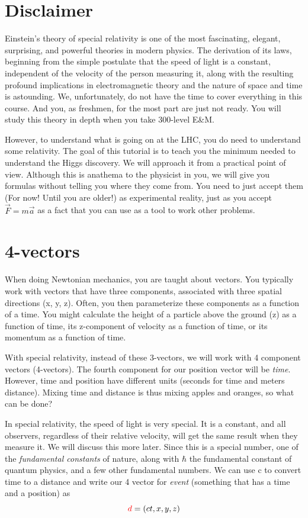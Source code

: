  
\section{Disclaimer}

Einstein's theory of special relativity is one of the most fascinating, elegant, surprising, and powerful theories in modern physics.  The derivation of its laws, beginning from the simple postulate that the speed of light is a constant, independent of the velocity of the person measuring it, along with the resulting profound implications in electromagnetic theory and the nature of space and time is astounding. We, unfortunately, do not have the time to cover everything in this course.  And you, as freshmen, for the most part are just not ready.  You will study this theory in depth when you take 300-level E\&M.

However, to understand what is going on at the LHC, you do need to understand some relativity.  The goal of this tutorial is to teach you the minimum needed to understand the Higgs discovery.  We will approach it from a practical point of view. Although this is anathema to the physicist in you, we will give you formulas without telling you where they come from.  You need to just accept them (For now! Until you are older!) as experimental reality, just as you accept $\vec{F}=m\vec{a}$  as a fact that you can use as a tool to work other problems.

\section{4-vectors}

When doing Newtonian mechanics, you are taught about vectors.  You typically work with vectors that have three components, associated with three spatial directions (x, y, z).  Often, you then parameterize these components as a function of a time.  You might calculate the height of a particle above the ground (z) as a function of time, its z-component of velocity as a function of time, or its momentum as a function of time.

With special relativity, instead of these 3-vectors, we will work with 4 component vectors (4-vectors).  The fourth component for our position vector will be {\it time}.  However, time and position have different units (seconds for time and meters distance).  Mixing time and distance is thus mixing apples and oranges, so what can be done?

In special relativity, the speed of light is very special.  It is a constant, and all observers, regardless of their relative velocity, will get the same result when they measure it. We will discuss this more later.  Since this is a special number, one of the {\it fundamental constants} of nature, along with  $\hbar$ the fundamental constant of quantum physics, and a few other fundamental numbers.  We can use c to convert time to a distance and write our 4 vector for {\it event} (something that has a time and a position) as
\begin{equation}
	  {\color{red} d}=(ct,x,y,z)
\end{equation}

